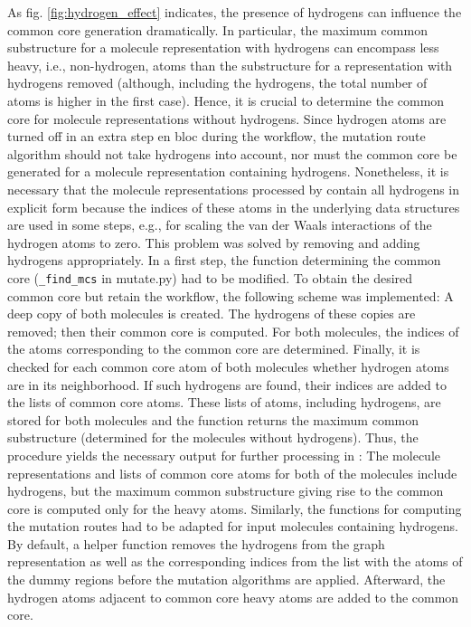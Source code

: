 As fig. \ref{fig:hydrogen_effect} indicates, the presence of hydrogens can influence the common core generation dramatically. In particular, the maximum common substructure for a molecule representation with hydrogens can encompass less heavy, i.e., non-hydrogen, atoms than the substructure for a representation with hydrogens removed (although, including the hydrogens, the total number of atoms is higher in the first case). Hence, it is crucial to determine the common core for molecule representations without hydrogens. Since hydrogen atoms are turned off in an extra step en bloc during the {\trafo} workflow, the mutation route algorithm should not take hydrogens into account, nor must the common core be generated for a molecule representation containing hydrogens.
Nonetheless, it is necessary that the molecule representations processed by \trafo contain all hydrogens in explicit form because the indices of these atoms in the underlying data structures are used in some steps, e.g., for scaling the van der Waals interactions of the hydrogen atoms to zero.
This problem was solved by removing and adding hydrogens appropriately.
In a first step, the {\trafo} function determining the common core (\texttt{\_find\_mcs} in mutate.py) had to be modified. To obtain the desired common core but retain the {\trafo} workflow, the following scheme was implemented:
A deep copy of both molecules is created. The hydrogens of these copies are removed; then their common core is computed. For both molecules, the indices of the atoms corresponding to the common core are determined. Finally, it is checked for each common core atom of both molecules whether hydrogen atoms are in its neighborhood. If such hydrogens are found, their indices are added to the lists of common core atoms. These lists of atoms, including hydrogens, are stored for both molecules and the function returns the maximum common substructure (determined for the molecules without hydrogens).
Thus, the procedure yields the necessary output for further processing in {\trafo}: The molecule representations and lists of common core atoms for both of the molecules include hydrogens, but the maximum common substructure giving rise to the common core is computed only for the heavy atoms.
Similarly, the functions for computing the mutation routes had to be adapted for input molecules containing hydrogens. By default, a helper function removes the hydrogens from the graph representation as well as the corresponding indices from the list with the atoms of the dummy regions before the mutation algorithms are applied. Afterward, the hydrogen atoms adjacent to common core heavy atoms are added to the common core.
